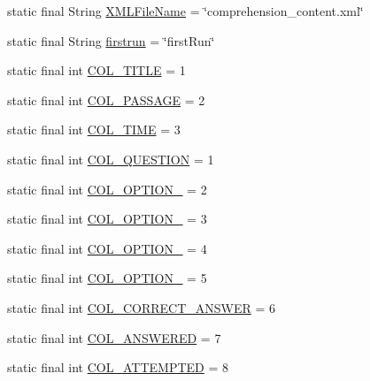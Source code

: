 \begin{DoxyCompactItemize}
\item 
static final String \hyperlink{classorg_1_1buildmlearn_1_1comprehension_1_1Constants_a37c033f17439d68472ded50cf2bf94d5}{X\+M\+L\+File\+Name} = \char`\"{}comprehension\+\_\+content.\+xml\char`\"{}
\item 
static final String \hyperlink{classorg_1_1buildmlearn_1_1comprehension_1_1Constants_a61c1e6d5be66a5ffcd1032edfa055c5f}{firstrun} = \char`\"{}first\+Run\char`\"{}
\item 
static final int \hyperlink{classorg_1_1buildmlearn_1_1comprehension_1_1Constants_a2ba8d55ece1831a335934501ed0fe0cd}{C\+O\+L\+\_\+\+T\+I\+T\+LE} = 1
\item 
static final int \hyperlink{classorg_1_1buildmlearn_1_1comprehension_1_1Constants_a5563979cee196a7e774b1ae209c34d6f}{C\+O\+L\+\_\+\+P\+A\+S\+S\+A\+GE} = 2
\item 
static final int \hyperlink{classorg_1_1buildmlearn_1_1comprehension_1_1Constants_ae6a82271c112b3484b1b9e728c844df1}{C\+O\+L\+\_\+\+T\+I\+ME} = 3
\item 
static final int \hyperlink{classorg_1_1buildmlearn_1_1comprehension_1_1Constants_aa24c6f72d131cbd38060eae7abd2555e}{C\+O\+L\+\_\+\+Q\+U\+E\+S\+T\+I\+ON} = 1
\item 
static final int \hyperlink{classorg_1_1buildmlearn_1_1comprehension_1_1Constants_abd9d6118a4f54cfd81bacc6a69df4a5a}{C\+O\+L\+\_\+\+O\+P\+T\+I\+O\+N\+\_} = 2
\item 
static final int \hyperlink{classorg_1_1buildmlearn_1_1comprehension_1_1Constants_a329affeea048a35e9c969f9691755b03}{C\+O\+L\+\_\+\+O\+P\+T\+I\+O\+N\+\_} = 3
\item 
static final int \hyperlink{classorg_1_1buildmlearn_1_1comprehension_1_1Constants_a14a4165d59b5a3de3d7e11711ef2fe58}{C\+O\+L\+\_\+\+O\+P\+T\+I\+O\+N\+\_} = 4
\item 
static final int \hyperlink{classorg_1_1buildmlearn_1_1comprehension_1_1Constants_a43ab021b4fa1799a9f41ce7eca188afb}{C\+O\+L\+\_\+\+O\+P\+T\+I\+O\+N\+\_} = 5
\item 
static final int \hyperlink{classorg_1_1buildmlearn_1_1comprehension_1_1Constants_acc6ba45da4ddae0deab563149225c40c}{C\+O\+L\+\_\+\+C\+O\+R\+R\+E\+C\+T\+\_\+\+A\+N\+S\+W\+ER} = 6
\item 
static final int \hyperlink{classorg_1_1buildmlearn_1_1comprehension_1_1Constants_a49897631bcb19cf5e24b08dea9c7ce44}{C\+O\+L\+\_\+\+A\+N\+S\+W\+E\+R\+ED} = 7
\item 
static final int \hyperlink{classorg_1_1buildmlearn_1_1comprehension_1_1Constants_a0e615bb8050703f7deef80babd498eeb}{C\+O\+L\+\_\+\+A\+T\+T\+E\+M\+P\+T\+ED} = 8
\end{DoxyCompactItemize}



